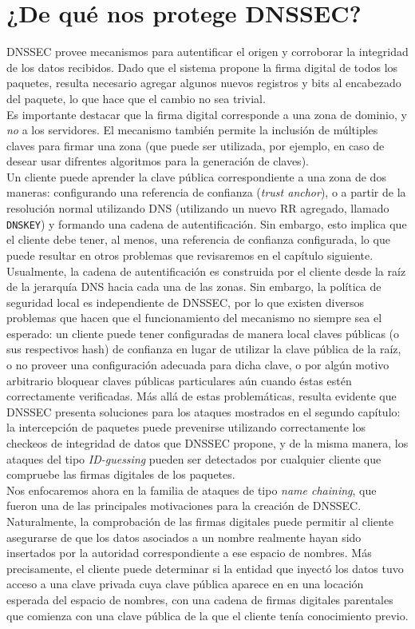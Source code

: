 \chapter{¿De qu\'e nos protege DNSSEC?}
DNSSEC provee mecanismos para autentificar el origen y corroborar la integridad de los datos recibidos. Dado que el sistema propone la firma digital de todos los paquetes, resulta necesario agregar algunos nuevos registros y bits al encabezado del paquete, lo que hace que el cambio no sea trivial.\\
Es importante destacar que la firma digital corresponde a una zona de dominio, y \textit{no} a los servidores. El mecanismo tambi\'en permite la inclusi\'on de m\'ultiples claves para firmar una zona (que puede ser utilizada, por ejemplo, en caso de desear usar difrentes algoritmos para la generaci\'on de claves).\\
Un cliente puede aprender la clave p\'ublica correspondiente a una zona de dos maneras: configurando una referencia de confianza (\textit{trust anchor}), o a partir de la resoluci\'on normal utilizando DNS (utilizando un nuevo RR agregado, llamado \texttt{DNSKEY}) y formando una cadena de autentificaci\'on. Sin embargo, esto implica que el cliente debe tener, al menos, una referencia de confianza configurada, lo que puede resultar en otros problemas que revisaremos en el cap\'itulo siguiente.\\
Usualmente, la cadena de autentificaci\'on es construida por el cliente desde la ra\'iz de la jerarqu\'ia DNS hacia cada una de las zonas. Sin embargo, la pol\'itica de seguridad local es independiente de DNSSEC, por lo que existen diversos problemas que hacen que el funcionamiento del mecanismo no siempre sea el esperado: un cliente puede tener configuradas de manera local claves p\'ublicas (o sus respectivos hash) de confianza en lugar de utilizar la clave p\'ublica de la ra\'iz, o no proveer una configuraci\'on adecuada para dicha clave, o por alg\'un motivo arbitrario bloquear claves p\'ublicas particulares a\'un cuando \'estas est\'en correctamente verificadas.
M\'as all\'a de estas problem\'aticas, resulta evidente que DNSSEC presenta soluciones para los ataques mostrados en el segundo cap\'itulo: la intercepci\'on de paquetes puede prevenirse utilizando correctamente los checkeos de integridad de datos que DNSSEC propone, y de la misma manera, los ataques del tipo \textit{ID-guessing} pueden ser detectados por cualquier cliente que compruebe las firmas digitales de los paquetes.\\
Nos enfocaremos ahora en la familia de ataques de tipo \textit{name chaining}, que fueron una de las principales motivaciones para la creaci\'on de DNSSEC. Naturalmente, la comprobaci\'on de las firmas digitales puede permitir al cliente asegurarse de que los datos asociados a un nombre realmente hayan sido insertados por la autoridad correspondiente a ese espacio de nombres. M\'as precisamente, el cliente puede determinar si la entidad que inyect\'o los datos tuvo acceso a una clave privada cuya clave p\'ublica aparece en en una locaci\'on esperada del espacio de nombres, con una cadena de firmas digitales parentales que comienza con una clave p\'ublica de la que el cliente ten\'ia conocimiento previo.\\
